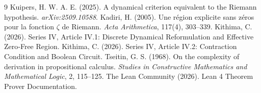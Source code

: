 \documentclass[11pt,a4paper]{article}
\begin{document}

\begin{thebibliography}{9}
  Kuipers, H. W. A. E. (2025). A dynamical criterion equivalent to the Riemann hypothesis. \emph{arXiv:2509.10588}.
  Kadiri, H. (2005). Une région explicite sans zéros pour la fonction $\zeta$ de Riemann. \emph{Acta Arithmetica}, 117(4), 303–339.
  Kithima, C. (2026). Series IV, Article IV.1: Discrete Dynamical Reformulation and Effective Zero‑Free Region.
  Kithima, C. (2026). Series IV, Article IV.2: Contraction Condition and Boolean Circuit.
  Tseitin, G. S. (1968). On the complexity of derivation in propositional calculus. \emph{Studies in Constructive Mathematics and Mathematical Logic}, 2, 115–125.
  The Lean Community (2026). Lean 4 Theorem Prover Documentation.
\end{thebibliography}
\end{document}
